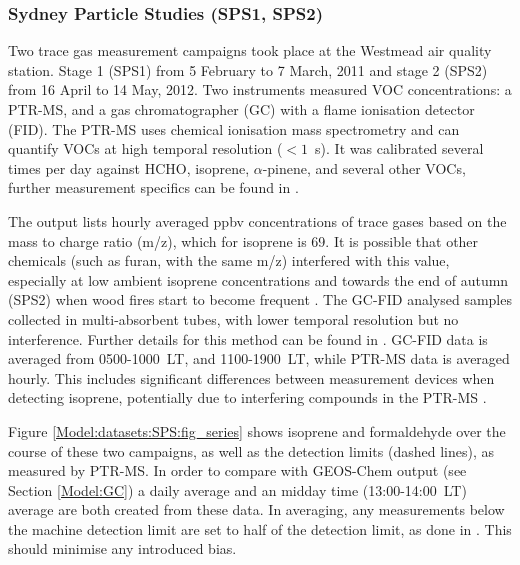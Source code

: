     \subsubsection{Sydney Particle Studies (SPS1, SPS2)}
    \label{Model:datasets:SPS}
      Two trace gas measurement campaigns took place at the Westmead air quality station. %
      Stage 1 (SPS1) from 5 February to 7 March, 2011 and stage 2 (SPS2) from 16 April to 14 May, 2012.
      Two instruments measured VOC concentrations: a PTR-MS, and a gas chromatographer (GC) with a flame ionisation detector (FID).
      The PTR-MS uses chemical ionisation mass spectrometry and can quantify VOCs at high temporal resolution ($< 1$~s).
      It was calibrated several times per day against HCHO, isoprene, $\alpha$-pinene, and several other VOCs, further measurement specifics can be found in \textcite{Dunne2018}.
      
      The output lists hourly averaged ppbv concentrations of trace gases based on the mass to charge ratio (m/z), which for isoprene is 69.
      It is possible that other chemicals (such as furan, with the same m/z) interfered with this value, especially at low ambient isoprene concentrations and towards the end of autumn (SPS2) when wood fires start to become frequent \parencite{Guerette2018}.
      The GC-FID analysed samples collected in multi-absorbent tubes, with lower temporal resolution but no interference. 
      Further details for this method can be found in \textcite{Cheng2016}.
      GC-FID data is averaged from 0500-1000~LT, and 1100-1900~LT, while PTR-MS data is averaged hourly.
      This includes significant differences between measurement devices when detecting isoprene, potentially due to interfering compounds in the PTR-MS \parencite{Dunne2018}.
      
      Figure \ref{Model:datasets:SPS:fig_series} shows isoprene and formaldehyde over the course of these two campaigns, as well as the detection limits (dashed lines), as measured by PTR-MS. 
      In order to compare with GEOS-Chem output (see Section \ref{Model:GC}) a daily average and an midday time (13:00-14:00~LT) average are both created from these data.
      In averaging, any measurements below the machine detection limit are set to half of the detection limit, as done in \textcite{Lawson2015}. 
      This should minimise any introduced bias.
      
      {\label{Model:datasets:SPS:fig_series}}
    
